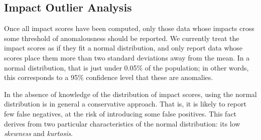 

\subsection{Impact Outlier Analysis}

Once all impact scores have been computed, only those data whose
impacts cross some threshold of anomalousness should be
reported. We currently treat the impact scores as if they fit a normal
distribution, and only report data whose scores place them more
than two standard deviations away from the mean. In a normal
distribution, that is just under 0.05\% of the population; in other
words, this corresponds to a 95\% confidence level that these are
anomalies.

In the absence of knowledge of the distribution of impact scores, using
the normal distribution is in general a conservative approach. That is, it
is likely to report few false negatives, at the risk of introducing some false
positives. This fact derives from two particular characteristics of the
normal distribution: its low \emph{skewness} and \emph{kurtosis}.


